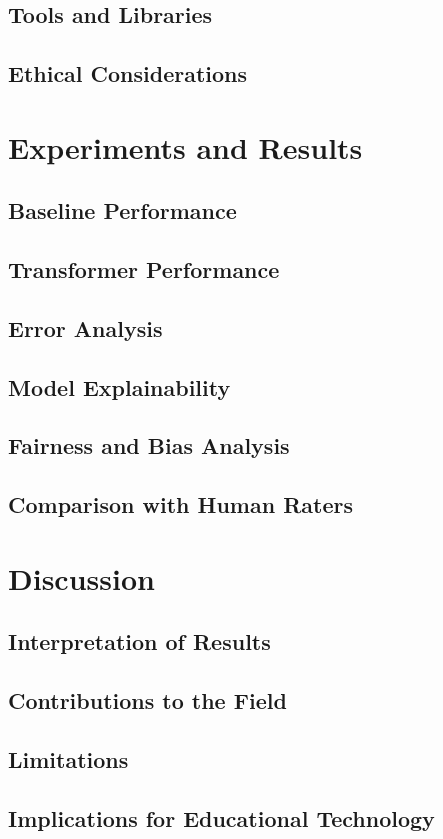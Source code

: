 \documentclass[12pt,a4paper]{report}
\begin{document}
\section{Tools and Libraries}
\section{Ethical Considerations}

\chapter{Experiments and Results}
\section{Baseline Performance}
\section{Transformer Performance}
\section{Error Analysis}
\section{Model Explainability}
\section{Fairness and Bias Analysis}
\section{Comparison with Human Raters}

\chapter{Discussion}
\section{Interpretation of Results}
\section{Contributions to the Field}
\section{Limitations}
\section{Implications for Educational Technology}
\end{document}
